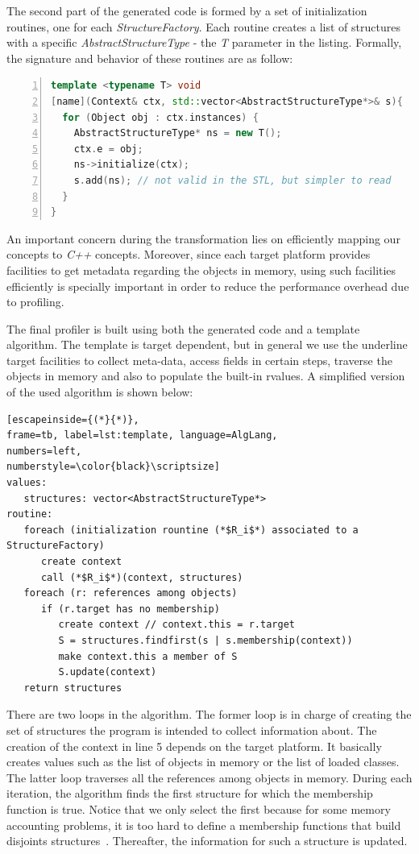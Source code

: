 The second part of the generated code is formed by a set of initialization routines, one for each \textit{StructureFactory}.
Each routine creates a list of structures with a specific \textit{AbstractStructureType} - the \textit{T} parameter in the listing.
Formally, the signature and behavior of these routines are as follow:
\begin{lstlisting}[language=C++, frame=tblr,
numbers=left,
numberstyle=\color{black}\scriptsize,]
template <typename T> void
[name](Context& ctx, std::vector<AbstractStructureType*>& s){
  for (Object obj : ctx.instances) {
    AbstractStructureType* ns = new T();
    ctx.e = obj;
    ns->initialize(ctx);
    s.add(ns); // not valid in the STL, but simpler to read
  }
}
\end{lstlisting}
An important concern during the transformation lies on efficiently mapping our concepts to \textit{C++} concepts.
Moreover, since each target platform provides facilities to get metadata regarding the objects in memory, using such facilities efficiently is specially important in order to reduce the performance overhead due to profiling.

The final profiler is built using both the generated code and a template algorithm.
The template is target dependent, but in general we use the underline target facilities to collect meta-data, access fields in certain steps, traverse the objects in memory and also to populate the built-in rvalues.
A simplified version of the used algorithm is shown below:
\begin{lstlisting}[escapeinside={(*}{*)},
frame=tb, label=lst:template, language=AlgLang,
numbers=left,
numberstyle=\color{black}\scriptsize]
values:
   structures: vector<AbstractStructureType*>
routine:
   foreach (initialization rountine (*$R_i$*) associated to a StructureFactory)
      create context
	  call (*$R_i$*)(context, structures)
   foreach (r: references among objects)
      if (r.target has no membership)
         create context // context.this = r.target
         S = structures.findfirst(s | s.membership(context))
         make context.this a member of S
         S.update(context)
   return structures 
\end{lstlisting}
There are two loops in the algorithm. 
The former loop is in charge of creating the set of structures the program is intended to collect information about.
The creation of the context in line 5 depends on the target platform.
It basically creates values such as the list of objects in memory or the list of loaded classes.
The latter loop traverses all the references among objects in memory.
During each iteration, the algorithm finds the first structure for which the membership function is true.
Notice that we only select the first because for some memory accounting problems, it is too hard to define a membership functions that build disjoints structures~\cite{dsn/09/geoffray/ijvm,Attouchi:2014:MMM:2602458.2602467}.
Thereafter, the information for such a structure is updated.


